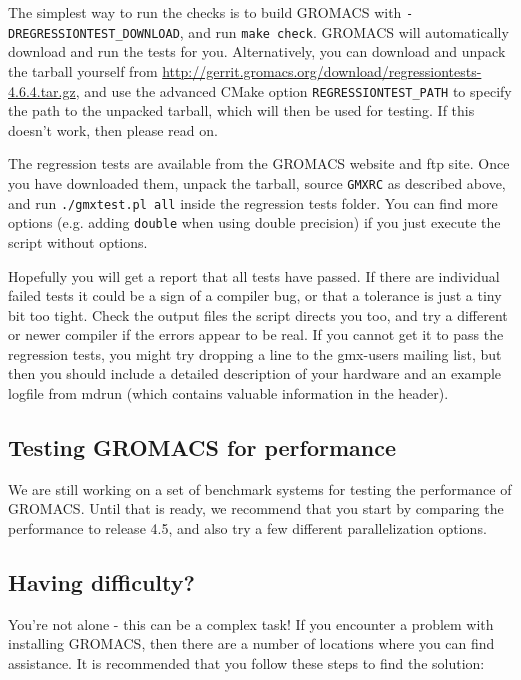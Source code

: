\documentclass{article}[12pt,a4paper,twoside]
\newcommand{\gromacs}{GROMACS}
\newcommand{\cmake}{CMake}
\begin{document}
The simplest way to run the checks is to build \gromacs{} with
\verb+-DREGRESSIONTEST_DOWNLOAD+, and run \verb+make check+.
\gromacs{} will automatically download and run the tests for you.
Alternatively, you can download and unpack the tarball yourself from
\url{http://gerrit.gromacs.org/download/regressiontests-4.6.4.tar.gz},
and use the advanced \cmake{} option \verb+REGRESSIONTEST_PATH+ to
specify the path to the unpacked tarball, which will then be used for
testing. If this doesn't work, then please read on.

The regression tests are available from the \gromacs{} website and ftp
site.  Once you have downloaded them, unpack the tarball, source
\verb+GMXRC+ as described above, and run \verb+./gmxtest.pl all+
inside the regression tests folder. You can find more options
(e.g. adding \verb+double+ when using double precision) if you just
execute the script without options.

Hopefully you will get a report that all tests have passed. If there
are individual failed tests it could be a sign of a compiler bug, or
that a tolerance is just a tiny bit too tight. Check the output files
the script directs you too, and try a different or newer compiler if
the errors appear to be real. If you cannot get it to pass the
regression tests, you might try dropping a line to the gmx-users
mailing list, but then you should include a detailed description of
your hardware and an example logfile from mdrun (which contains
valuable information in the header).

\subsection{Testing \gromacs{} for performance}
We are still working on a set of benchmark systems for testing
the performance of \gromacs{}. Until that is ready, we recommend that
you start by comparing the performance to release 4.5, and also try
a few different parallelization options.

\subsection{Having difficulty?}
You're not alone - this can be a complex task! If you encounter a
problem with installing \gromacs{}, then there are a number of
locations where you can find assistance. It is recommended that you
follow these steps to find the solution:
\end{document}
